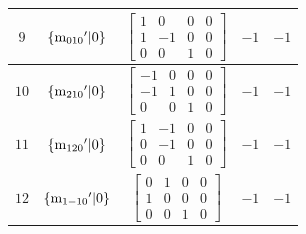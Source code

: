\documentclass[fleqn,8pt]{jsarticle}
\begin{document}
\begin{longtable}{ccccc}
$ 9 $ & $ \{{\rm m}_{010}{}'|0\} $ & $ \begin{bmatrix} 1 & 0 & 0 & 0 \\ 1 & -1 & 0 & 0 \\ 0 & 0 & 1 & 0 \end{bmatrix} $ & $ -1 $ & $ -1 $ \\ \hline
$ 10 $ & $ \{{\rm m}_{210}{}'|0\} $ & $ \begin{bmatrix} -1 & 0 & 0 & 0 \\ -1 & 1 & 0 & 0 \\ 0 & 0 & 1 & 0 \end{bmatrix} $ & $ -1 $ & $ -1 $ \\ \hline
$ 11 $ & $ \{{\rm m}_{120}{}'|0\} $ & $ \begin{bmatrix} 1 & -1 & 0 & 0 \\ 0 & -1 & 0 & 0 \\ 0 & 0 & 1 & 0 \end{bmatrix} $ & $ -1 $ & $ -1 $ \\ \hline
$ 12 $ & $ \{{\rm m}_{1-10}{}'|0\} $ & $ \begin{bmatrix} 0 & 1 & 0 & 0 \\ 1 & 0 & 0 & 0 \\ 0 & 0 & 1 & 0 \end{bmatrix} $ & $ -1 $ & $ -1 $ \\
\end{longtable}
\end{document}
